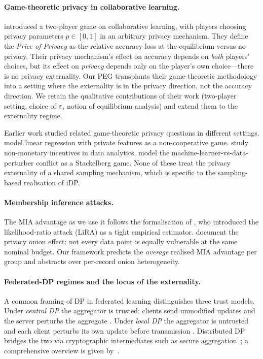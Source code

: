 \paragraph{Game-theoretic privacy in collaborative learning.}
\citet{pejo2019together} introduced a two-player game on collaborative
learning, with players choosing privacy parameters $p \in [0, 1]$ in an
arbitrary privacy mechanism. They define the \emph{Price of Privacy} as the
relative accuracy loss at the equilibrium versus no privacy. Their
privacy mechanism's effect on accuracy depends on \emph{both} players'
choices, but its effect on \emph{privacy} depends only on the player's own
choice---there is no privacy externality. Our PEG transplants their
game-theoretic methodology into a setting where the externality is in the
privacy direction, not the accuracy direction. We retain the qualitative
contributions of their work (two-player setting, choice of $\varepsilon$,
notion of equilibrium analysis) and extend them to the externality regime.

Earlier work studied related game-theoretic privacy questions in different
settings. \citet{ioannidis2013linear} model linear regression with private
features as a non-cooperative game. \citet{chessa2015game} study non-monetary
incentives in data analytics. \citet{pawlick2016stackelberg} model the
machine-learner-vs-data-perturber conflict as a Stackelberg game. None of
these treat the privacy externality of a shared sampling mechanism, which is
specific to the sampling-based realisation of iDP.

\paragraph{Membership inference attacks.}
The MIA advantage as we use it follows the formalisation of
\citet{carlini2022membership}, who introduced the likelihood-ratio attack
(LiRA) as a tight empirical estimator. \citet{carlini2022privacy} document
the privacy onion effect: not every data point is equally vulnerable at
the same nominal budget. Our framework predicts the \emph{average} realised
MIA advantage per group and abstracts over per-record onion heterogeneity.

\paragraph{Federated-DP regimes and the locus of the externality.}
A common framing of DP in federated learning distinguishes three trust
models. Under \emph{central DP} the aggregator is trusted: clients send
unmodified updates and the server perturbs the aggregate
\cite{geyer2017differentially}. Under \emph{local DP} the aggregator is
untrusted and each client perturbs its own update before transmission
\cite{truex2020ldp}. Distributed DP bridges the two via cryptographic
intermediates such as secure aggregation~\cite{bonawitz2017practical};
a comprehensive overview is given by~\citet{kairouz2021advances}.

